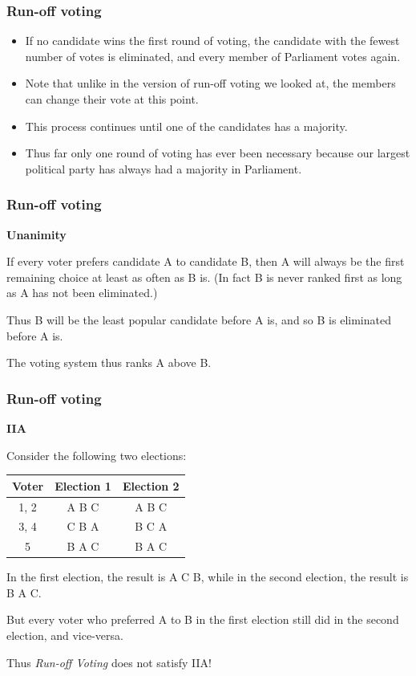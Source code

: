 \documentclass{beamer}
\newcommand{\heading}[1]{{\Large\bfseries #1}\vspace{1em}}
\begin{document}
    \begin{frame}
        \frametitle{Run-off voting}
    
        \begin{itemize}
            \item If no candidate wins the first round of voting, the candidate with the fewest number of votes is eliminated, and every member of Parliament votes again. \pause
            \item Note that unlike in the version of run-off voting we looked at, the members can change their vote at this point. \pause
            \item This process continues until one of the candidates has a majority. \pause
            \item Thus far only one round of voting has ever been necessary because our largest political party has always had a majority in Parliament.
        \end{itemize}
    
    \end{frame}
    \begin{frame}
        \frametitle{Run-off voting}
        \heading{Unanimity}
    
        If every voter prefers candidate A to candidate B, then A will always be the first remaining choice at least as often as B is. (In fact B is never ranked first as long as A has not been eliminated.) \pause

        Thus B will be the least popular candidate before A is, and so B is eliminated before A is. \pause

        The voting system thus ranks A above B.

    \end{frame}
    \begin{frame}
        \frametitle{Run-off voting}
        \heading{IIA}
    
        Consider the following two elections:
        \begin{center}
            \begin{tabular}{|c|c|c|}
                \hline
                Voter & Election 1 & Election 2 \\
                \hline
                1, 2 & A B C & A B C \\
                3, 4 & C B A & B C A \\
                5 & B A C & B A C \\
                \hline
            \end{tabular}
        \end{center} \pause

        In the first election, the result is A C B, while in the second election, the result is B A C. \pause

        But every voter who preferred A to B in the first election still did in the second election, and vice-versa. \pause

        Thus \emph{Run-off Voting} \alert{does not satisfy} IIA!

    \end{frame}
\end{document}
